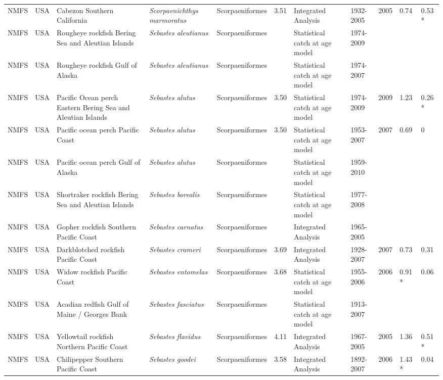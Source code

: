 \begin{longtable}{p{1.5cm}p{1.5cm}p{3cm}p{3cm}p{2.5cm}p{0.9cm}p{1.4cm}p{0.9cm}p{0.9cm}p{0.9cm}p{1cm}}
  NMFS & USA & Cabezon Southern California & \textit{Scorpaenichthys marmoratus} & Scorpaeniformes & 3.51 & Integrated Analysis & 1932-2005 & 2005 & 0.74 & 0.53 * \\ 
  NMFS & USA & Rougheye rockfish Bering Sea and Aleutian Islands & \textit{Sebastes aleutianus} & Scorpaeniformes &  & Statistical catch at age model & 1974-2009 &  &  &  \\ 
  NMFS & USA & Rougheye rockfish Gulf of Alaska & \textit{Sebastes aleutianus} & Scorpaeniformes &  & Statistical catch at age model & 1974-2007 &  &  &  \\ 
  NMFS & USA & Pacific Ocean perch Eastern Bering Sea and Aleutian Islands & \textit{Sebastes alutus} & Scorpaeniformes & 3.50 & Statistical catch at age model & 1974-2009 & 2009 & 1.23 & 0.26 * \\ 
  NMFS & USA & Pacific ocean perch Pacific Coast & \textit{Sebastes alutus} & Scorpaeniformes & 3.50 & Statistical catch at age model & 1953-2007 & 2007 & 0.69 & 0 \\ 
  NMFS & USA & Pacific ocean perch Gulf of Alaska & \textit{Sebastes alutus} & Scorpaeniformes &  & Statistical catch at age model & 1959-2010 &  &  &  \\ 
  NMFS & USA & Shortraker rockfish Bering Sea and Aleutian Islands & \textit{Sebastes borealis} & Scorpaeniformes &  & Statistical catch at age model & 1977-2008 &  &  &  \\ 
  NMFS & USA & Gopher rockfish Southern Pacific Coast & \textit{Sebastes carnatus} & Scorpaeniformes &  & Integrated Analysis & 1965-2005 &  &  &  \\ 
  NMFS & USA & Darkblotched rockfish Pacific Coast & \textit{Sebastes crameri} & Scorpaeniformes & 3.69 & Integrated Analysis & 1928-2007 & 2007 & 0.73 & 0.31 \\ 
  NMFS & USA & Widow rockfish Pacific Coast & \textit{Sebastes entomelas} & Scorpaeniformes & 3.68 & Statistical catch at age model & 1955-2006 & 2006 & 0.91 * & 0.06 \\ 
  NMFS & USA & Acadian redfish Gulf of Maine / Georges Bank & \textit{Sebastes fasciatus} & Scorpaeniformes &  & Statistical catch at age model & 1913-2007 &  &  &  \\ 
  NMFS & USA & Yellowtail rockfish Northern Pacific Coast & \textit{Sebastes flavidus} & Scorpaeniformes & 4.11 & Integrated Analysis & 1967-2005 & 2005 & 1.36 & 0.51 * \\ 
  NMFS & USA & Chilipepper Southern Pacific Coast & \textit{Sebastes goodei} & Scorpaeniformes & 3.58 & Integrated Analysis & 1892-2007 & 2006 & 1.43 * & 0.04 \\ 

\end{longtable}
